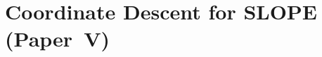 \documentclass[aspectratio=1610,onlytextwidth]{beamer}
\begin{document}
%

\section{Coordinate Descent for SLOPE (Paper~V)}
\end{document}
